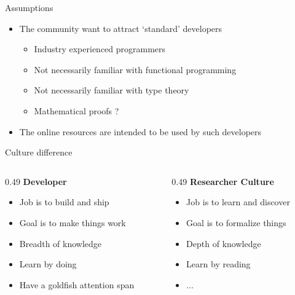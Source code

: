 \documentclass[xcolor=x11names]{beamer}
\renewcommand{\(}{\begin{columns}}
\renewcommand{\)}{\end{columns}}
\newcommand{\<}[1]{\begin{column}{#1}}
\renewcommand{\>}{\end{column}}
\begin{document}
\begin{frame}{Assumptions}
   \begin{itemize}
      \item The community want to attract `standard' developers
            \begin{itemize}
               \item Industry experienced programmers
               \item Not necessarily familiar with functional programming
               \item Not necessarily familiar with type theory
               \item Mathematical proofs ?
            \end{itemize}
      \item The online resources are intended to be used by such developers
   \end{itemize}
   \begin{block}{Culture difference}
      \([T]
      \<{0.49\textwidth}
      \centering
      \textbf{Developer} \\
      \vspace{0.5em}
      \begin{itemize}
         \item Job is to build and ship
         \item Goal is to make things work
         \item Breadth of knowledge
         \item Learn by doing
         \item Have a goldfish attention span
      \end{itemize}
      \>
      \<{0.49\textwidth}
      \centering
      \textbf{Researcher Culture} \\
      \vspace{0.5em}
      \begin{itemize}
         \item Job is to learn and discover
         \item Goal is to formalize things
         \item Depth of knowledge
         \item Learn by reading
         \item ...
      \end{itemize}
      \>
      \)
   \end{block}
\end{frame}
\end{document}
